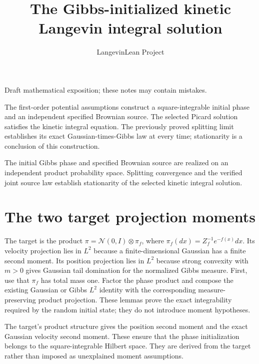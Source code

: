 \documentclass[11pt,a4paper]{article}
\title{\texorpdfstring{The Gibbs-initialized kinetic Langevin integral solution}{The Gibbs-initialized kinetic Langevin integral solution}}
\author{LangevinLean Project}
\date{}
\begin{document}
\maketitle
Draft mathematical exposition; these notes may contain mistakes.


The first-order potential assumptions construct a square-integrable initial phase and an independent specified Brownian source. The selected Picard solution satisfies the kinetic integral equation. The previously proved splitting limit establishes its exact Gaussian-times-Gibbs law at every time; stationarity is a conclusion of this construction.



The initial Gibbs phase and specified Brownian source are realized on an independent product probability space. Splitting convergence and the verified joint source law establish stationarity of the selected kinetic integral solution.


\section{\texorpdfstring{The two target projection moments}{The two target projection moments}}


The target is the product \(\pi=\mathcal N(0,I)\otimes\pi_f\), where \(\pi_f(dx)=Z_f^{-1}e^{-f(x)}dx\). Its velocity projection lies in \(L^{2}\) because a finite-dimensional Gaussian has a finite second moment. Its position projection lies in \(L^{2}\) because strong convexity with \(m>0\) gives Gaussian tail domination for the normalized Gibbs measure. First, use that \(\pi_f\) has total mass one. Factor the phase product and compose the existing Gaussian or Gibbs \(L^{2}\) identity with the corresponding measure-preserving product projection. These lemmas prove the exact integrability required by the random initial state; they do not introduce moment hypotheses.



The target’s product structure gives the position second moment and the exact Gaussian velocity second moment. These ensure that the phase initialization belongs to the square-integrable Hilbert space. They are derived from the target rather than imposed as unexplained moment assumptions.
\end{document}
